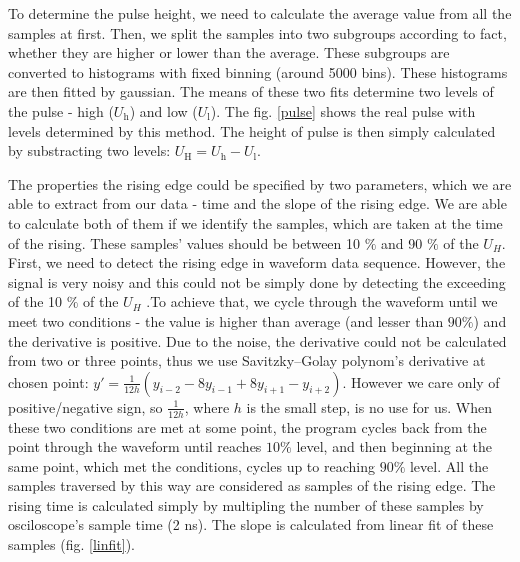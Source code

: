 To determine the pulse height, we need to calculate the average value from all the samples at first. Then, we split the samples into two subgroups according to fact, whether they are higher or lower than the average. These subgroups are converted to histograms with fixed binning (around 5000 bins). These histograms are then fitted by gaussian. The means of these two fits determine two levels of the pulse - high ($U_\textrm{h}$) and low ($U_\textrm{l}$). The fig. \ref{pulse} shows the real pulse with levels determined by this method. The height of pulse is then simply calculated by substracting two levels: $U_\textrm{H} = U_\textrm{h} - U_\textrm{l}$.

\par
The properties the rising edge could be specified by two parameters, which we are able to extract from our data - time and the slope of the rising edge. We are able to calculate both of them if we identify the samples, which are taken at the time of the rising. These samples' values should be between 10 $\%$ and 90 $\%$ of the $U_{H}$. First, we need to detect the rising edge in waveform data sequence. However, the signal is very noisy and this could not be simply done by detecting the exceeding of the 10 $\%$ of the $U_{H}$ .To achieve that, we cycle through the waveform until we meet two conditions - the value is higher than average (and lesser than $90 \%$) and the derivative is positive. Due to the noise, the derivative could not be calculated from two or three points, thus we use Savitzky–Golay polynom's derivative at chosen point: $y' = \frac{1}{12h}(y_{i-2} -8y_{i-1} + 8y_{i+1} - y_{i+2}) $. However we care only of positive/negative sign, so $\frac{1}{12h}$, where $h$ is the small step, is no use for us. When these two conditions are met at some point, the program cycles back from the point through the waveform until reaches $10\%$ level, and then beginning at the same point, which met the conditions, cycles up to reaching $90\%$ level. All the samples traversed by this way are considered as samples of the rising edge. The rising time is calculated simply by multipling the number of these samples by osciloscope's sample time (2 ns). The slope is calculated from linear fit of these samples (fig. \ref{linfit}).  



